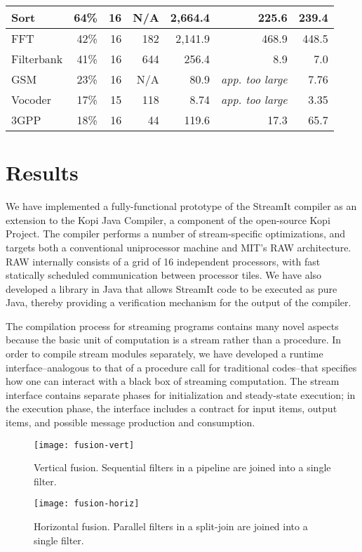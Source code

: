 \begin{table*}
\begin{tabular}{l||r|r|r|r||r||r}
Sort   & 64\% & 16  & N/A &  2,664.4 & 225.6 & 239.4 \\ \hline
FFT    & 42\% & 16  & 182 &  2,141.9 & 468.9 & 448.5  \\ \hline
Filterbank & 
       41\% & 16  &  644 &   256.4  & 8.9 & 7.0   \\ \hline
GSM    & 23\% & 16 & N/A &    80.9  & {\it app. too large} & 7.76 \\ \hline
Vocoder& 17\% & 15  & 118 &     8.74  & {\it app. too large} & 3.35  \\ \hline
3GPP   & 18\% & 16  & 44 &   119.6  & 17.3  & 65.7   \\ \hline
\end{tabular}
\end{table*}

\section{Results}
\label{sec:results}

We have implemented a fully-functional prototype of the StreamIt
compiler as an extension to the Kopi Java Compiler, a component of the
open-source Kopi Project\cite{kopi}.  The compiler performs a number
of stream-specific optimizations, and targets both a conventional
uniprocessor machine and MIT's RAW architecture.  RAW internally
consists of a grid of 16 independent processors, with fast statically
scheduled communication between processor tiles\cite{rawshort}.  We
have also developed a library in Java that allows StreamIt code to be
executed as pure Java, thereby providing a verification mechanism for
the output of the compiler.

The compilation process for streaming programs contains many novel
aspects because the basic unit of computation is a stream rather than a
procedure.  In order to compile stream modules separately, we have
developed a runtime interface--analogous to that of a procedure call for
traditional codes--that specifies how one can interact with a black box
of streaming computation.  The stream interface contains separate phases
for initialization and steady-state execution; in the execution phase,
the interface includes a contract for input items, output items, and
possible message production and consumption.

\begin{figure}
  \centering
  \texttt{[image: fusion-vert]}
  \caption{Vertical fusion.  Sequential filters in a pipeline are
    joined into a single filter.}
  \label{fig:vert-fusion}
\end{figure}
\begin{figure}
  \centering
  \texttt{[image: fusion-horiz]}
  \caption{Horizontal fusion.  Parallel filters in a split-join are
    joined into a single filter.}
  \label{fig:horiz-fusion}
\end{figure}

